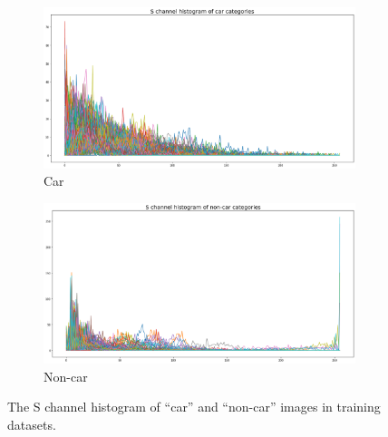 \documentclass{article}[12pt]
\begin{document}
\begin{figure}[H]
    \centering
    \begin{subfigure}[b]{0.45\textwidth}
        \centering
        \includegraphics[width=\textwidth]{figure/S_car.png}
        \caption{Car}
    \end{subfigure}
    \hfill
    \begin{subfigure}[b]{0.45\textwidth}
        \centering
        \includegraphics[width=\textwidth]{figure/S_noncar.png}
        \caption{Non-car}
    \end{subfigure}
    \caption{The S channel histogram of ``car'' and ``non-car'' images in training datasets.}
    \label{fig:hsv_s}
\end{figure}
\end{document}
